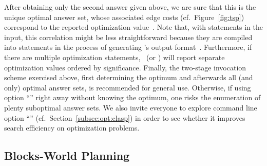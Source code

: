 %
After obtaining only the second answer given above,
we are sure that this is the unique optimal answer set,
whose associated edge costs (cf.\ Figure~\ref{fig:tsp}) correspond to
the reported optimization value~.
Note that, with  statements in the input, this correlation
might be less straightforward because they are compiled into 
statements in the process of generating \lparse's output format~\cite{lparseManual}.
Furthermore, if there are multiple optimization statements,
\clasp\ (or \clingo) will report separate optimization values ordered by significance.
Finally, the two-stage invocation scheme exercised above,
first determining the optimum and afterwards all (and only) optimal answer sets,
is recommended for general use.
Otherwise,
if using option ``'' right away without knowing the optimum,
one risks the enumeration of plenty suboptimal answer sets.
We also invite everyone to explore command line option ``''
(cf.\ Section~\ref{subsec:opt:clasp})
in order to see whether it improves search efficiency on optimization problems.


\subsection{Blocks-World Planning}\label{subsec:ex:block}

